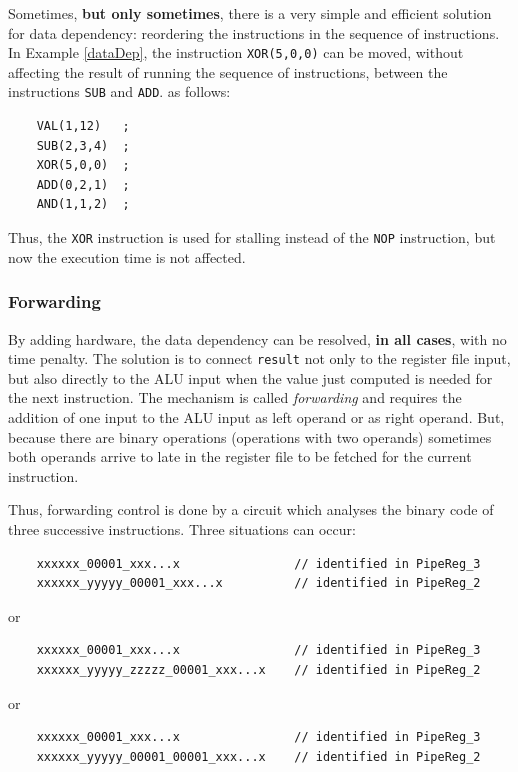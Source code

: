 Sometimes, {\bf but only sometimes}, there is a very simple and efficient solution for data dependency: reordering the instructions in the sequence of instructions. In Example \ref{dataDep}, the instruction {\tt XOR(5,0,0)} can be moved, without affecting the result of running the sequence of instructions, between the instructions {\tt SUB} and {\tt ADD}. as follows:
\begin{verbatim}
    VAL(1,12)   ;
    SUB(2,3,4)  ;
    XOR(5,0,0)  ;
    ADD(0,2,1)  ;
    AND(1,1,2)  ;
\end{verbatim}
Thus, the {\tt XOR} instruction is used for stalling instead of the {\tt NOP} instruction, but now the execution time is not affected.

\subsubsection{Forwarding}

By adding hardware, the data dependency can be resolved, {\bf in all cases}, with no time penalty. The solution is to connect {\tt result} not only to the register file input, but also directly to the ALU input when the value just computed is needed for the next instruction. The mechanism is called {\em forwarding} and requires the addition of one input to the  ALU input as left operand or as right operand. But, because there are binary operations (operations with two operands) sometimes both operands arrive to late in the register file to be fetched for the current instruction.

Thus, forwarding control is done by a circuit which analyses the binary code of three successive instructions. Three situations can occur:


\begin{verbatim}
    xxxxxx_00001_xxx...x                // identified in PipeReg_3
    xxxxxx_yyyyy_00001_xxx...x          // identified in PipeReg_2
\end{verbatim}
or
\begin{verbatim}
    xxxxxx_00001_xxx...x                // identified in PipeReg_3
    xxxxxx_yyyyy_zzzzz_00001_xxx...x    // identified in PipeReg_2
\end{verbatim}
or
\begin{verbatim}
    xxxxxx_00001_xxx...x                // identified in PipeReg_3
    xxxxxx_yyyyy_00001_00001_xxx...x    // identified in PipeReg_2
\end{verbatim}

